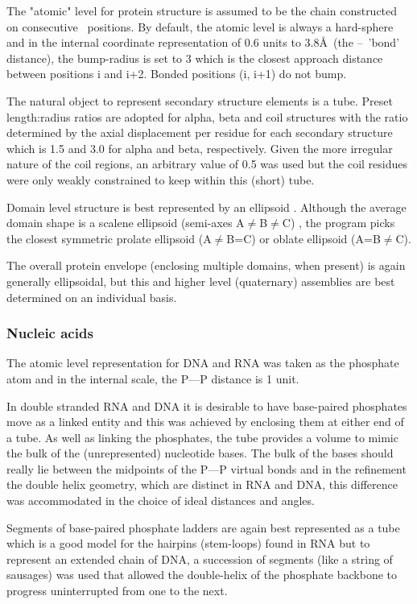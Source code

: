\documentclass[review]{elsarticle}
\begin{document}
The "atomic" level for protein structure is assumed to be the chain constructed on
consecutive \CA\ positions.   By default, the atomic level is always a hard-sphere
and in the internal coordinate representation of 0.6 units to 3.8\AA\ (the \CA--\CA\
'bond' distance), the bump-radius is set to 3 which is the closest approach distance 
between positions i and i+2.   Bonded positions (i, i+1) do not bump.  

The natural object to represent secondary structure elements is a tube.   Preset
length:radius ratios are adopted for alpha, beta and coil structures with the ratio
determined by the axial displacement per residue for each secondary structure which
is 1.5 and 3.0 for alpha and beta, respectively.   Given the more irregular nature
of the coil regions, an arbitrary value of 0.5 was used but the coil residues were
only weakly constrained to keep within this (short) tube.

Domain level structure is best represented by an ellipsoid \cite{TaylorWRet83b}.  
Although the average domain shape is a scalene ellipsoid (semi-axes A$\ne$B$\ne$C)
\cite{AszodiAet94a}, the program picks
the closest symmetric prolate ellipsoid (A$\ne$B=C) or oblate ellipsoid (A=B$\ne$C).

The overall protein envelope (enclosing multiple domains, when present) is again generally
ellipsoidal, but this and higher level (quaternary) assemblies are best determined on an individual basis.

\subsubsection{Nucleic acids}

The atomic level representation for DNA and RNA was taken as the phosphate atom
and in the internal scale, the P---P distance is 1 unit.

In double stranded RNA and DNA it is desirable to have base-paired phosphates
move as a linked entity and this was achieved by enclosing them at either end of
a tube.  As well as linking the phosphates, the tube provides a volume to mimic
the bulk of the (unrepresented) nucleotide bases.   The bulk of the bases should
really lie between the midpoints of the P---P virtual bonds and in the refinement the
double helix geometry, which are distinct in RNA and DNA, this difference
was accommodated in the choice of ideal distances and angles.

Segments of base-paired phosphate ladders are again best represented as a tube
which is a good model for the hairpins (stem-loops) found in RNA but to represent an extended
chain of DNA, a succession of segments (like a string of sausages) was used that allowed the
double-helix of the phosphate backbone to progress uninterrupted from one to the next.
\end{document}
